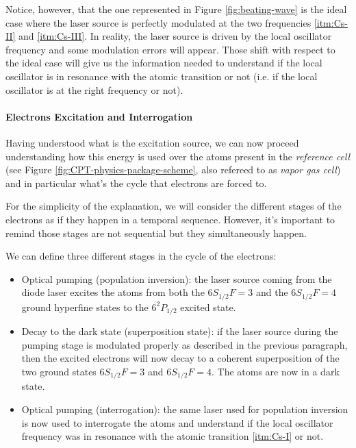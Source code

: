 Notice, however, that the one represented in Figure \ref{fig:beating-wave} is the ideal case where the laser source is perfectly modulated at the two frequencies \ref{itm:Cs-II} and \ref{itm:Cs-III}.
In reality, the laser source is driven by the local oscillator frequency and some modulation errors will appear.
Those shift with respect to the ideal case will give us the information needed to understand if the local oscillator is in resonance with the atomic transition or not (i.e. if the local oscillator is at the right frequency or not).

\paragraph{Electrons Excitation and Interrogation}

Having understood what is the excitation source, we can now proceed understanding how this energy is used over the atoms present in the \textit{reference cell} (see Figure \ref{fig:CPT-physics-package-scheme}, also refereed to as \textit{vapor gas cell}) and in particular what's the cycle that electrons are forced to.

For the simplicity of the explanation, we will consider the different stages of the electrons as if they happen in a temporal sequence.
However, it's important to remind those stages are not sequential but they simultaneously happen.

We can define three different stages in the cycle of the electrons:

\begin{itemize}
    \item Optical pumping (population inversion): the laser source coming from the diode laser excites the atoms from both the $6S_{1/2} F=3$ and the $6S_{1/2} F=4$ ground hyperfine states to the $6^2P_{1/2}$ excited state.
    \item Decay to the dark state (superposition state): if the laser source during the pumping stage is modulated properly as described in the previous paragraph, then the excited electrons will now decay to a coherent superposition of the two ground states $6S_{1/2} F=3$ and $6S_{1/2} F=4$. The atoms are now in a dark state.
    \item Optical pumping (interrogation): the same laser used for population inversion is now used to interrogate the atoms and understand if the local oscillator frequency was in resonance with the atomic transition \ref{itm:Cs-I} or not.
\end{itemize}

